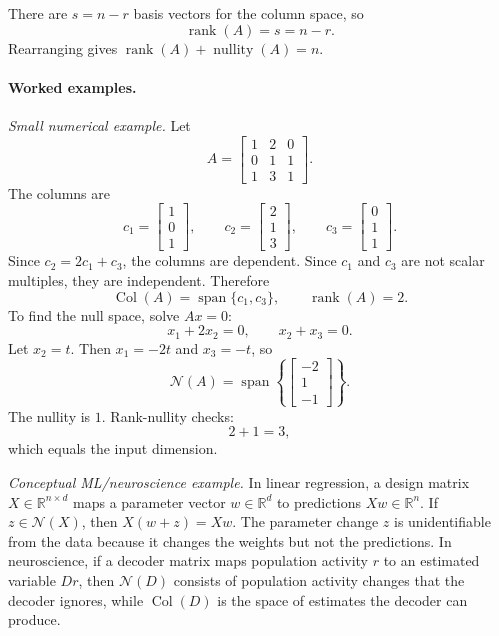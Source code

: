 There are \(s=n-r\) basis vectors for the column space, so
\[
\operatorname{rank}(A)=s=n-r.
\]
Rearranging gives \(\operatorname{rank}(A)+\operatorname{nullity}(A)=n\).

\paragraph{Worked examples.}
\emph{Small numerical example.} Let
\[
A=
\begin{bmatrix}
1&2&0\\
0&1&1\\
1&3&1
\end{bmatrix}.
\]
The columns are
\[
c_1=\begin{bmatrix}1\\0\\1\end{bmatrix},
\qquad
c_2=\begin{bmatrix}2\\1\\3\end{bmatrix},
\qquad
c_3=\begin{bmatrix}0\\1\\1\end{bmatrix}.
\]
Since \(c_2=2c_1+c_3\), the columns are dependent. Since \(c_1\) and \(c_3\) are not scalar multiples, they are independent. Therefore
\[
\operatorname{Col}(A)=\operatorname{span}\{c_1,c_3\},
\qquad
\operatorname{rank}(A)=2.
\]
To find the null space, solve \(Ax=0\):
\[
x_1+2x_2=0,
\qquad
x_2+x_3=0.
\]
Let \(x_2=t\). Then \(x_1=-2t\) and \(x_3=-t\), so
\[
\mathcal{N}(A)=\operatorname{span}\left\{
\begin{bmatrix}-2\\1\\-1\end{bmatrix}
\right\}.
\]
The nullity is \(1\). Rank-nullity checks:
\[
2+1=3,
\]
which equals the input dimension.

\emph{Conceptual ML/neuroscience example.} In linear regression, a design matrix \(X\in\mathbb{R}^{n\times d}\) maps a parameter vector \(w\in\mathbb{R}^d\) to predictions \(Xw\in\mathbb{R}^n\). If \(z\in\mathcal{N}(X)\), then \(X(w+z)=Xw\). The parameter change \(z\) is unidentifiable from the data because it changes the weights but not the predictions. In neuroscience, if a decoder matrix maps population activity \(r\) to an estimated variable \(Dr\), then \(\mathcal{N}(D)\) consists of population activity changes that the decoder ignores, while \(\operatorname{Col}(D)\) is the space of estimates the decoder can produce.

